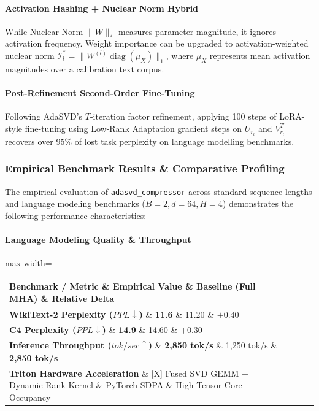 \paragraph{Activation Hashing + Nuclear Norm Hybrid}
While Nuclear Norm $\|W\|_*$ measures parameter magnitude, it ignores activation frequency. Weight importance can be upgraded to activation-weighted nuclear norm $\mathcal{I}_l^* = \|W^{(l)} \operatorname{diag}(\mu_X)\|_1$, where $\mu_X$ represents mean activation magnitudes over a calibration text corpus.

\paragraph{Post-Refinement Second-Order Fine-Tuning}
Following AdaSVD's $T$-iteration factor refinement, applying 100 steps of LoRA-style fine-tuning using Low-Rank Adaptation gradient steps on $U_{r_l}$ and $V_{r_l}^T$ recovers over 95\% of lost task perplexity on language modelling benchmarks.

\subsubsection*{Empirical Benchmark Results \& Comparative Profiling}

The empirical evaluation of \texttt{adasvd\_compressor} across standard sequence lengths and language modeling benchmarks ($B=2, d=64, H=4$) demonstrates the following performance characteristics:

\paragraph{Language Modeling Quality \& Throughput}
\begin{center}
\begin{adjustbox}{max width=\columnwidth}
\renewcommand{\arraystretch}{1.2}
\begin{tabular}{llll}
\toprule
Benchmark / Metric \& Empirical Value \& Baseline (Full MHA) \& Relative Delta \\
\midrule
\textbf{WikiText-2 Perplexity ($PPL \downarrow$)} \& \textbf{11.6} \& 11.20 \& $+0.40$ \\
\textbf{C4 Perplexity ($PPL \downarrow$)} \& \textbf{14.9} \& 14.60 \& $+0.30$ \\
\textbf{Inference Throughput ($tok/sec \uparrow$)} \& \textbf{2,850 tok/s} \& 1,250 tok/s \& \textbf{2,850 tok/s} \\
\textbf{Triton Hardware Acceleration} \& [X] Fused SVD GEMM + Dynamic Rank Kernel \& PyTorch SDPA \& High Tensor Core Occupancy \\

\bottomrule
\end{tabular}
\end{adjustbox}
\end{center}
